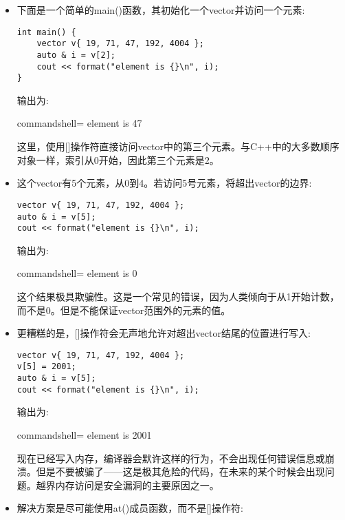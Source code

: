 \begin{itemize}
\item 
下面是一个简单的main()函数，其初始化一个vector并访问一个元素:

\begin{lstlisting}[style=styleCXX]
int main() {
	vector v{ 19, 71, 47, 192, 4004 };
	auto & i = v[2];
	cout << format("element is {}\n", i);
}
\end{lstlisting}

输出为:

\begin{tcblisting}{commandshell={}}
element is 47
\end{tcblisting}

这里，使用[]操作符直接访问vector中的第三个元素。与C++中的大多数顺序对象一样，索引从0开始，因此第三个元素是2。

\item 
这个vector有5个元素，从0到4。若访问5号元素，将超出vector的边界:

\begin{lstlisting}[style=styleCXX]
vector v{ 19, 71, 47, 192, 4004 };
auto & i = v[5];
cout << format("element is {}\n", i);
\end{lstlisting}

输出为:

\begin{tcblisting}{commandshell={}}
element is 0
\end{tcblisting}

这个结果极具欺骗性。这是一个常见的错误，因为人类倾向于从1开始计数，而不是0。但是不能保证vector范围外的元素的值。

\item 
更糟糕的是，[]操作符会无声地允许对超出vector结尾的位置进行写入:

\begin{lstlisting}[style=styleCXX]
vector v{ 19, 71, 47, 192, 4004 };
v[5] = 2001;
auto & i = v[5];
cout << format("element is {}\n", i);
\end{lstlisting}

输出为:

\begin{tcblisting}{commandshell={}}
element is 2001
\end{tcblisting}

现在已经写入内存，编译器会默许这样的行为，不会出现任何错误信息或崩溃。但是不要被骗了——这是极其危险的代码，在未来的某个时候会出现问题。越界内存访问是安全漏洞的主要原因之一。

\item 
解决方案是尽可能使用at()成员函数，而不是[]操作符:


\end{itemize}
